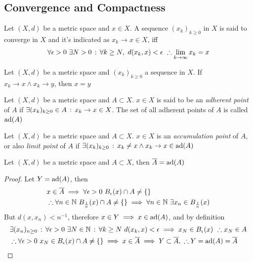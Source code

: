\documentclass[../complete.tex]{subfiles}
\begin{document}
\subsection{Convergence and Compactness}
\begin{dfn}[Convergence]
	Let $(X,d)$ be a metric space and $x\in X$. A sequence $(x_k)_{k\ge0}$ in $X$ is said to converge in $X$ and it's indicated as $x_k\to x\in X$, iff
	\begin{equation*}
		\forall\epsilon>0\ \exists N>0\st\forall k\ge N,\ d(x_k,x)<\epsilon\ \therefore\lim_{k\to\infty}x_k=x
	\end{equation*}
\end{dfn}
\begin{thm}
	Let $(X,d)$ be a metric space and $(x_k)_{k\ge0}$ a sequence in $X$. If $x_k\to x\wedge x_k\to y$, then $x=y$
\end{thm}
\begin{dfn}
	Let $(X,d)$ be a metric space and $A\subset X$. $x\in X$ is said to be an \textit{adherent point} of $A$ if $\exists(x_k)_{k\ge0}\in A\, :\,  x_k\to x\in X$. The set of all adherent points of $A$ is called $\operatorname{ad}(A)$
\end{dfn}
\begin{dfn}
	Let $(X,d)$ be a metric space and $A\subset X$. $x\in X$ is an \textit{accumulation point} of $A$, or also \textit{limit point} of $A$ if $\exists(x_k)_{k\ge0}\, :\,  x_k\ne x\wedge x_k\to x\in\operatorname{ad}(A)$
\end{dfn}
\begin{prop}
	Let $(X,d)$ be a metric space and $A\subset X$, then $\overline{A}=\operatorname{ad}(A)$
\end{prop}
\begin{proof}
	Let $Y=\operatorname{ad}(A)$, then
	\begin{equation*}
		\begin{aligned}
			&x\in\cc{A}\implies{}\forall\epsilon>0\ B_\epsilon(x)\cap A\ne\{\}\\
			&\therefore\forall n\in\N\ B_{\frac{1}{n}}(x)\cap A\ne\{\}\implies{}\forall n\in\N\ \exists x_n\in B_{\frac{1}{n}}(x)
		\end{aligned}
	\end{equation*}
	But $d(x,x_n)<n^{-1}$, therefore $x\in Y\implies{} x\in\operatorname{ad}(A)$, and by definition
	\begin{equation*}
		\begin{aligned}
			&\exists(x_n)_{n\ge0}\, :\, \forall\epsilon>0\ \exists N\in\mathbb{N}\, :\, \forall k\ge N\ d(x_k,x)<\epsilon\implies{} x_N\in B_\epsilon(x)\ \therefore x_N\in A\\
			&\therefore\forall\epsilon>0\ x_N\in B_\epsilon(x)\cap A\ne\{\}\implies{} x\in\overline{A}\implies{} Y\subset\overline{A},\ \therefore Y=\operatorname{ad}(A)=\overline{A}
		\end{aligned}
	\end{equation*}
\end{proof}
\end{document}
